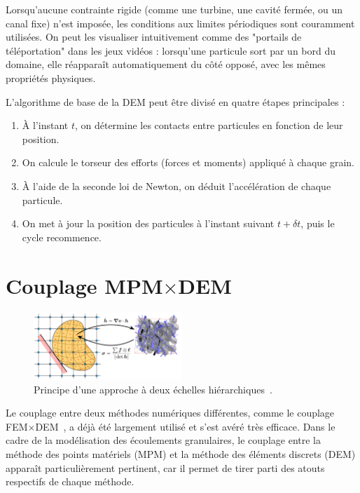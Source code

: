 \documentclass[a4paper,12pt]{report}
\begin{document}
Lorsqu’aucune contrainte rigide (comme une turbine, une cavité fermée, ou un canal fixe) n’est imposée, les conditions aux limites périodiques sont couramment utilisées. On peut les visualiser intuitivement comme des "portails de téléportation" dans les jeux vidéos : lorsqu'une particule sort par un bord du domaine, elle réapparaît automatiquement du côté opposé, avec les mêmes propriétés physiques.

L’algorithme de base de la DEM peut être divisé en quatre étapes principales :

\begin{enumerate}
    \item À l’instant $t$, on détermine les contacts entre particules en fonction de leur position.
    \item On calcule le torseur des efforts (forces et moments) appliqué à chaque grain.
    \item À l’aide de la seconde loi de Newton, on déduit l’accélération de chaque particule.
    \item On met à jour la position des particules à l’instant suivant $t + \delta t$, puis le cycle recommence.
\end{enumerate}


\section{Couplage MPM$\times$DEM}

\begin{figure}[h]
\centering
\includegraphics[width=0.5\textwidth]{CouplageMPMxDEM.png}
\caption{Principe d’une approche à deux échelles hiérarchiques~\citep{projetderecherche}.}
\label{fig:MPMxDEM}
\end{figure}

Le couplage entre deux méthodes numériques différentes, comme le couplage FEM$\times$DEM~\citep{nguyen2013modelisation}, a déjà été largement utilisé et s’est avéré très efficace.  
Dans le cadre de la modélisation des écoulements granulaires, le couplage entre la méthode des points matériels (MPM) et la méthode des éléments discrets (DEM) apparaît particulièrement pertinent, car il permet de tirer parti des atouts respectifs de chaque méthode.
\end{document}
